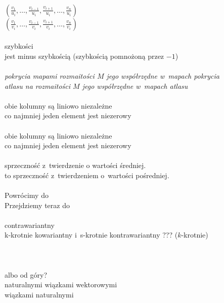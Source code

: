 \documentclass[a4paper,11pt]{article}
\numberwithin{equation}{section}
\begin{document}
\noindent
{} \\[0.3em]
\Jest
$( \frac{ v_{ 1 } }{ u_{ i } }, \ldots, \frac{ v_{ i - 1 } }{ u_{ i } },
\frac{ v_{ i + 1 } }{ u_{ i } }, \ldots, \frac{ v_{ n } }{ u_{ i } } )$ \\[0.5em]
\Powin
$\left( \frac{ v_{ 1 } }{ v_{ i } }, \ldots, \frac{ v_{ i - 1 } }{ v_{ i } },
  \frac{ v_{ i + 1 } }{ v_{ i } }, \ldots, \frac{ v_{ n } }{ v_{ i } } \right)$
\\[0.5em]
 \\
\Jest  szybkości \\
\Powin jest minus szybkością (szybkością pomnożoną przez $-1$) \\
 \\
\Jest  \textit{pokrycia mapami rozmaitości $M$ jego współrzędne
  w~mapach pokrycia} \\
\Powin \textit{atlasu na rozmaitości $M$ jego współrzędne
  w~mapach atlasu} \\
 \\
\Jest  obie kolumny są liniowo niezależne \\
\Powin co najmniej jeden element jest niezerowy \\
 \\
\Jest  obie kolumny są liniowo niezależne \\
\Powin co najmniej jeden element jest niezerowy \\
 \\
\Jest  sprzeczność z~twierdzenie o wartości średniej. \\
\Powin to sprzeczność z~twierdzeniem o~wartości pośredniej. \\
 \\
\Jest  Powrócimy do \\
\Powin Przejdziemy teraz do \\
 \\
\Jest  contrawariantny \\
\Powin k-krotnie kowariantny i~s-krotnie kontrawariantny ??? ($k$-krotnie) \\
 \\
\Jest  \\
\Powin \\
 albo od góry? \\
\Jest  naturalnymi wiązkami wektorowymi \\
\Powin wiązkami naturalnymi \\
\end{document}

